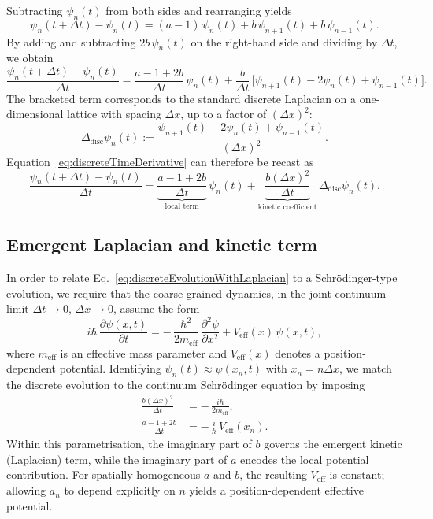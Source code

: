 \documentclass[11pt,a4paper]{article}
\begin{document}
Subtracting $\psi_{n}(t)$ from both sides and rearranging yields
\[
\psi_{n}(t+\Delta t) - \psi_{n}(t)
= (a-1)\,\psi_{n}(t)
+ b\,\psi_{n+1}(t) + b\,\psi_{n-1}(t).
\]
By adding and subtracting $2b\,\psi_{n}(t)$ on the right-hand side and dividing by $\Delta t$, we obtain
\begin{equation}
\frac{\psi_{n}(t+\Delta t) - \psi_{n}(t)}{\Delta t}
= \frac{a-1+2b}{\Delta t}\,\psi_{n}(t)
+ \frac{b}{\Delta t}\,\bigl[\psi_{n+1}(t) - 2\psi_{n}(t) + \psi_{n-1}(t)\bigr].
\label{eq:discreteTimeDerivative}
\end{equation}
The bracketed term corresponds to the standard discrete Laplacian on a one-dimensional lattice with spacing $\Delta x$, up to a factor of $(\Delta x)^{2}$:
\begin{equation}
\Delta_{\mathrm{disc}} \psi_{n}(t)
:= \frac{\psi_{n+1}(t) - 2\psi_{n}(t) + \psi_{n-1}(t)}{(\Delta x)^{2}}.
\label{eq:discreteLaplacian}
\end{equation}
Equation~\eqref{eq:discreteTimeDerivative} can therefore be recast as
\begin{equation}
\frac{\psi_{n}(t+\Delta t) - \psi_{n}(t)}{\Delta t}
= \underbrace{\frac{a-1+2b}{\Delta t}}_{\text{local term}}\,\psi_{n}(t)
+ \underbrace{\frac{b(\Delta x)^{2}}{\Delta t}}_{\text{kinetic coefficient}}\,\Delta_{\mathrm{disc}} \psi_{n}(t).
\label{eq:discreteEvolutionWithLaplacian}
\end{equation}

\subsection{Emergent Laplacian and kinetic term}

In order to relate Eq.~\eqref{eq:discreteEvolutionWithLaplacian} to a Schr\"odinger-type evolution, we require that the coarse-grained dynamics, in the joint continuum limit $\Delta t\to 0$, $\Delta x\to 0$, assume the form
\begin{equation}
i\hbar\,\frac{\partial \psi(x,t)}{\partial t}
= -\,\frac{\hbar^{2}}{2m_{\mathrm{eff}}}\,\frac{\partial^{2}\psi}{\partial x^{2}} + V_{\mathrm{eff}}(x)\,\psi(x,t),
\label{eq:targetSchrodinger}
\end{equation}
where $m_{\mathrm{eff}}$ is an effective mass parameter and $V_{\mathrm{eff}}(x)$ denotes a position-dependent potential.
Identifying $\psi_{n}(t)\approx \psi(x_{n},t)$ with $x_{n}=n\Delta x$, we match the discrete evolution to the continuum Schr\"odinger equation by imposing
\begin{align}
\frac{b(\Delta x)^{2}}{\Delta t} &= -\,\frac{i\hbar}{2m_{\mathrm{eff}}}, \label{eq:bConstraint}\\
\frac{a-1+2b}{\Delta t} &= -\,\frac{i}{\hbar}\,V_{\mathrm{eff}}(x_{n}). \label{eq:aConstraint}
\end{align}
Within this parametrisation, the imaginary part of $b$ governs the emergent kinetic (Laplacian) term, while the imaginary part of $a$ encodes the local potential contribution.
For spatially homogeneous $a$ and $b$, the resulting $V_{\mathrm{eff}}$ is constant; allowing $a_{n}$ to depend explicitly on $n$ yields a position-dependent effective potential.\cite{Laubscher2026SchrodingerSketch}
\end{document}

